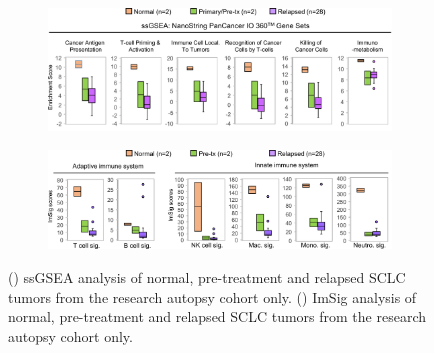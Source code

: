 \begin{figure}[htbp]
    \centering
    \begin{subfigure}{0.84\textwidth}
        \includegraphics[width=\linewidth,keepaspectratio]{images/sclc/ssgsea_autopsy_boxplot}
        \caption{}\label{fig:sclc:ssgsea_autopsy_boxplot}
    \end{subfigure}
    
    \begin{subfigure}{0.84\textwidth}
        \includegraphics[width=\linewidth,keepaspectratio]{images/sclc/imsig_autopsy_boxplot}
        \caption{}\label{fig:sclc:imsig_autopsy_boxplot}
    \end{subfigure}
    \vspace{-0.5cm}
    \caption[ssGSEA and ImSig scores for SCLC autopsy samples.]{() ssGSEA analysis of normal, pre-treatment and relapsed SCLC tumors from the research autopsy cohort only. () ImSig analysis of normal, pre-treatment and relapsed SCLC tumors from the research autopsy cohort only.}
    \label{fig:sclc:immune_rna_imsig}
\end{figure}

